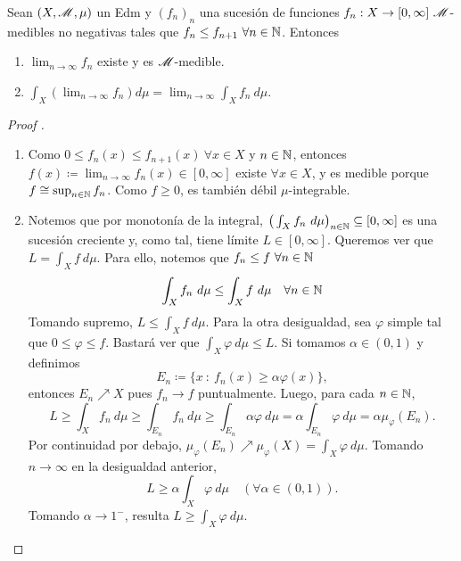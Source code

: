 \begin{theorem}
	Sean $(X, \mathscr{M}, \mu)$ un Edm y $(f_{n})_{n}$ una sucesión de funciones $f_{n} : X \to [0,\infty] \ \mathscr{M}$-medibles no negativas tales que $f_{n} \leq f_{n+1} \ \forall n \in \mathbb{N}$. Entonces
	\begin{enumerate}
		\item $\lim_{n \to \infty} f_{n}$ existe y es $\mathscr{M}$-medible.

		\item $\int_{X} (\lim_{n \to \infty} f_{n}) d\mu = \lim_{n \to \infty} \int_{X} f_{n} \ d\mu$.
	\end{enumerate}
\end{theorem}
\begin{proof}[Proof ]
	\begin{enumerate}
		\item Como $0 \leq f_{n}(x) \leq f_{n+1}(x) \ \forall x \in X$ y $n \in \mathbb{N}$, entonces $f(x) \coloneq \lim_{n \to \infty} f_{n}(x) \in [0,\infty]$ existe $\forall x \in X$, y es medible porque $f \cong \sup_{n \in \mathbb{N}} f_{n}$. Como $f \geq 0$, es también débil $\mu$-integrable.

		\item Notemos que por monotonía de la integral, $\big( \int_{X} f_{n} \ d\mu \big)_{n\in\mathbb{N}} \subseteq [0,\infty]$ es una sucesión creciente y, como tal, tiene límite $L \in [0,\infty]$. Queremos ver que $L = \int_{X} f \ d\mu$. Para ello, notemos que $f_{n} \leq f \ \forall n \in \mathbb{N}$
		\[ \int_{X} f_{n} \ d\mu \leq \int_{X} f \ d\mu \quad \forall n \in \mathbb{N} \]
		Tomando supremo, $L \leq \int_{X} f \ d\mu$. Para la otra desigualdad, sea $\varphi$ simple tal que $0 \leq \varphi \leq f$. Bastará ver que $\int_{X} \varphi \ d\mu \leq L$. Si tomamos $\alpha \in (0,1)$ y definimos
		\[ E_{n} \coloneq \{x \ : \ f_{n}(x) \geq \alpha \varphi(x)\}, \]
		entonces $E_{n} \nearrow X$ pues $f_{n} \longrightarrow f$ puntualmente. Luego, para cada $n \in \mathbb{N}$,
		\[ L \geq \int_{X} f_{n} \ d\mu \geq \int_{E_{n}} f_{n} \ d\mu \geq \int_{E_{n}} \alpha \varphi \ d\mu = \alpha \int_{E_{n}} \varphi \ d\mu = \alpha \mu_{\varphi}(E_{n}). \]
		Por continuidad por debajo, $\mu_{\varphi}(E_{n}) \nearrow \mu_{\varphi}(X) = \int_{X} \varphi \ d\mu$. Tomando $n \rightarrow \infty$ en la desigualdad anterior,
		\[ L \geq \alpha \int_{X} \varphi \ d\mu \quad (\forall \alpha \in (0,1)). \]
		Tomando $\alpha \rightarrow 1^{-}$, resulta $L \geq \int_{X} \varphi \ d\mu$.
	\end{enumerate}
\end{proof}

